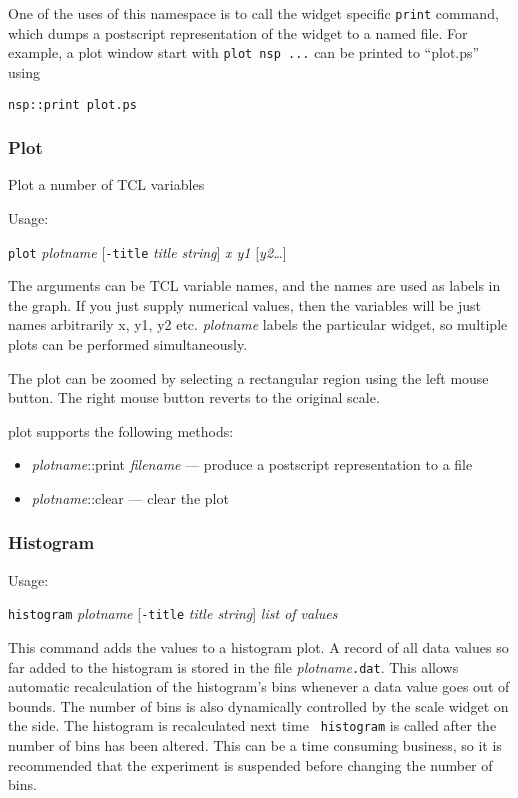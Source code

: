 One of the uses of this namespace is to call the widget specific
\verb+print+ command, which dumps a postscript
representation of the widget to a named file. For example, a plot
window start with \verb+plot nsp ...+ can be printed to ``plot.ps''
using
\begin{verbatim}
nsp::print plot.ps
\end{verbatim} 

\subsubsection{Plot}

Plot a number of TCL variables

Usage:

{\tt plot} {\em plotname} [{\tt -title} {\em title
  string}] {\em x y1} [{\em y2\ldots}]

The arguments can be TCL variable names, and the names are used as
labels in the graph. If you just supply numerical values, then the
variables will be just names arbitrarily x, y1, y2 etc. {\em plotname}
labels the particular widget, so multiple plots can be performed
simultaneously.

The plot can be zoomed by selecting a rectangular region using the
left mouse button. The right mouse button reverts to the original scale.

plot supports the following methods:
\begin{itemize}
\item {\em plotname}::print {\em filename} --- produce a postscript
  representation to a file
\item {\em  plotname}::clear --- clear the plot
\end{itemize}

\subsubsection{Histogram}

Usage:

{\tt histogram} {\em plotname} [{\tt -title} {\em
  title string}] {\em list of values}

This command adds the values to a histogram plot. A record of all data
values so far added to the histogram is stored in the file {\em
  plotname}{\tt .dat}. This allows automatic
recalculation of the histogram's bins whenever a data value goes out
of bounds. The number of bins is also dynamically controlled by the
scale widget on the side. The histogram is recalculated next time {\tt
  histogram} is called after the number of bins has been altered. This
can be a time consuming business, so it is recommended that the
experiment is suspended before changing the number of bins.


